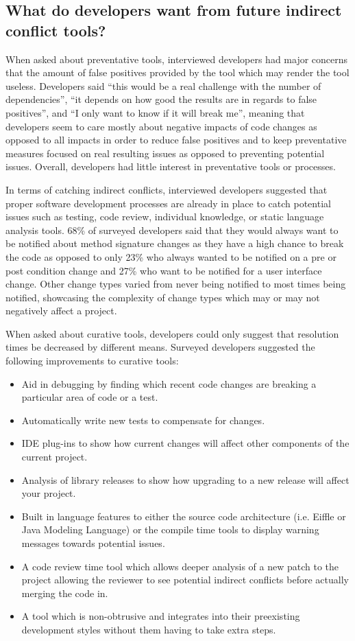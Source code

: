 \documentclass[conference]{IEEEtran}
\begin{document}
\subsection{What do developers want from future indirect conflict tools?}

When asked about preventative tools, interviewed developers had major concerns that the amount of false positives
provided by the tool which may render the tool useless. Developers said ``this would
be a real challenge with the number of dependencies'', ``it depends on how
good the results are in regards to false positives'', and ``I only want to know if it will break me'', meaning that
developers seem to care mostly about negative impacts of code changes as opposed to all impacts in order to reduce 
false positives and to keep preventative measures focused on real resulting issues as opposed to preventing potential
issues. Overall, developers had little interest in preventative tools or processes.

In terms of catching indirect conflicts, interviewed developers suggested that proper software development processes 
are already in place to catch potential issues such as testing, code review, 
individual knowledge, or static language analysis tools. 68\% of surveyed developers said that they would always
want to be notified about method signature changes as they have a high chance to break the code as opposed to only
23\% who always wanted to be notified on a pre or post condition change and 27\% who want to be notified for a user
interface change. Other change types varied from never being notified to most times being notified, showcasing the
complexity of change types which may or may not negatively affect a project.

When asked about curative tools, developers could only suggest that resolution times be decreased by different means.
Surveyed developers suggested the following improvements to curative tools: 

\begin{itemize}
	\item Aid in debugging by finding which recent code changes are breaking a particular area of code or a test.
	\item Automatically write new tests to compensate for changes.
	\item IDE plug-ins to show how current changes will affect other components of the current project.
	\item Analysis of library releases to show how upgrading to a new release will affect your project.
	\item Built in language features to either the source code architecture (i.e. Eiffle or Java Modeling Language) or the compile 
				time tools to display warning messages towards potential issues.
	\item A code review time tool which allows deeper analysis of a new patch to the project allowing the reviewer to see potential 
				indirect conflicts before actually merging the code in.
	\item A tool which is non-obtrusive and integrates into their preexisting development styles without them having to take extra steps.
\end{itemize}
\end{document}
